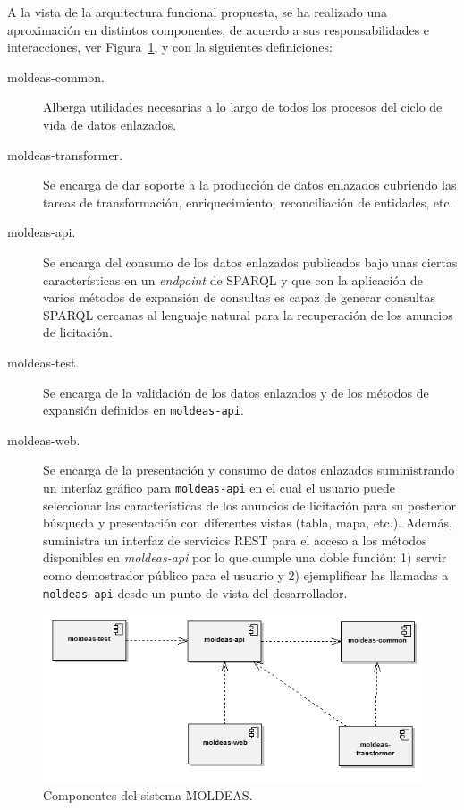 A la vista de la arquitectura funcional propuesta, se ha realizado una aproximación en distintos componentes, 
de acuerdo a sus responsabilidades e interacciones, ver Figura~\ref{fig:moldeas-components}, y con la siguientes 
definiciones:

\begin{description}
 \item [moldeas-common.] Alberga utilidades necesarias a lo largo de todos los procesos del ciclo de vida de datos 
enlazados.
 \item [moldeas-transformer.] Se encarga de dar soporte a la producción de datos enlazados cubriendo las tareas de transformación, 
  enriquecimiento, reconciliación de entidades, etc.  
 \item [moldeas-api.] Se encarga del consumo de los datos enlazados publicados bajo unas 
ciertas características en un \textit{endpoint} de SPARQL y que con la aplicación de varios 
métodos de expansión de consultas es capaz de generar consultas SPARQL cercanas al lenguaje natural 
para la recuperación de los anuncios de licitación.
\item [moldeas-test.] Se encarga de la validación de los datos enlazados y de los métodos de expansión definidos en \texttt{moldeas-api}.
 \item [moldeas-web.] Se encarga de la presentación y consumo de datos enlazados suministrando 
un interfaz gráfico para \texttt{moldeas-api} en el cual el usuario puede seleccionar las 
características de los anuncios de licitación para su posterior búsqueda y 
presentación con diferentes vistas (tabla, mapa, etc.). Además, suministra un interfaz de servicios REST para el acceso 
a los métodos disponibles en \textit{moldeas-api} por lo que cumple una doble función: 1) servir como demostrador 
público para el usuario y 2) ejemplificar las llamadas a \texttt{moldeas-api} desde un punto de vista 
del desarrollador.
\end{description}

\begin{figure}[!htb]
\centering
	\includegraphics[width=12cm]{images/phd/moldeas/moldeas-componentes}
\caption{Componentes del sistema MOLDEAS.}
\label{fig:moldeas-components}
\end{figure}

